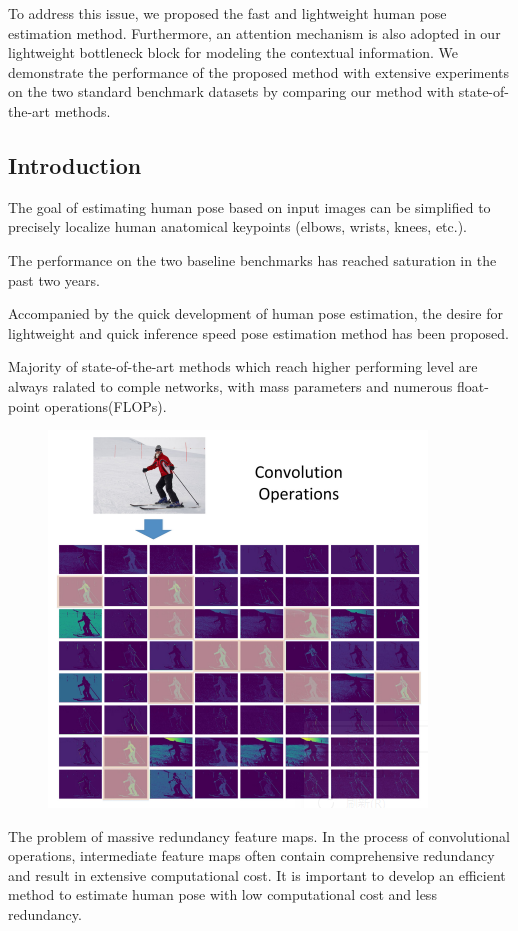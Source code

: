 \documentclass[11pt]{article}
\begin{document}
To address this issue, we proposed the fast and lightweight human pose estimation method. Furthermore, an attention mechanism is also adopted in our lightweight bottleneck block for modeling the contextual information. We demonstrate the performance of the proposed method with extensive experiments on the two standard benchmark datasets by comparing our method with state-of-the-art methods.

\subsection{Introduction}
The goal of estimating human pose based on input images can be simplified to precisely localize human anatomical keypoints (elbows, wrists, knees, etc.).

The performance on the two baseline benchmarks has reached saturation in the past two years.

Accompanied by the quick development of human pose estimation, the desire for lightweight and quick inference speed pose estimation method has been proposed.

Majority of state-of-the-art methods which reach higher performing level are always ralated to comple networks, with mass parameters and numerous float-point operations(FLOPs).

\begin{figure}[H]
	\centering
	\includegraphics[scale = 0.5]{78}
\end{figure}

The problem of massive redundancy feature maps. In the process of convolutional operations, intermediate feature maps often contain comprehensive redundancy and result in extensive computational cost. It is important to develop an efficient method to estimate human pose with low computational cost and less redundancy.
\end{document}
